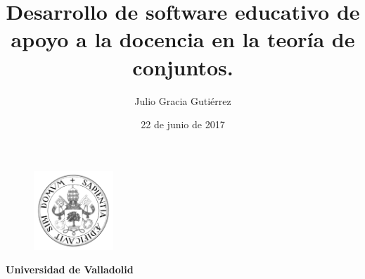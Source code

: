\documentclass[openright,twoside,10pt]{book}
\date{22 de junio de 2017}
\author{Julio Gracia Gutiérrez}
\title{Desarrollo de software educativo de apoyo a la docencia en la teoría de
conjuntos.}
\begin{document}
    {
        \selectfont
        \begin{titlepage}
        \begin{center}
            \vspace*{-1in}
            \begin{figure}[htb]
                \begin{center}
                    \includegraphics[width=3cm]{./latex/img/logo}
                \end{center}
            \end{figure}
            \begin{Large}
                \textbf{Universidad de Valladolid}
            \end{Large}


\end{center}
\end{titlepage}}
\end{document}
